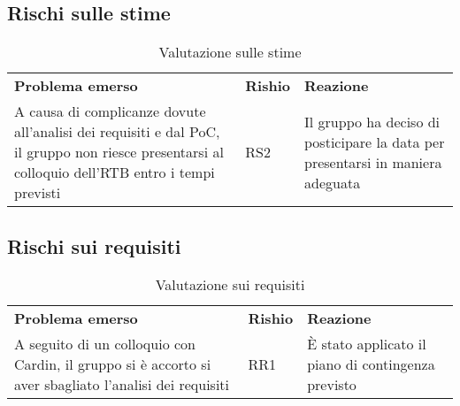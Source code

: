 \clearpage
\subsection{Rischi sulle stime}
    \begin{table}[h]
        \begin{adjustbox}{width=\textwidth}
            \centering
            \renewcommand{\arraystretch}{1.1}
                \begin{tabular}{>{\centering\arraybackslash} m{5cm} >{\centering\arraybackslash} m{1.5cm} >{\centering\arraybackslash} m{4cm}}
                    \rowcolor[HTML]{bfbfbf} 
                    \textbf{Problema emerso} & \textbf{Rishio} & \textbf{Reazione} \\
                    A causa di complicanze dovute all'analisi dei requisiti e dal PoC, il gruppo non riesce presentarsi al colloquio dell'RTB entro i tempi previsti & RS2 & Il gruppo ha deciso di posticipare la data per presentarsi in maniera adeguata\\
                \end{tabular}
            \end{adjustbox}
        \caption{Valutazione sulle stime}
    \end{table}


\subsection{Rischi sui requisiti}
    \begin{table}[h]
        \begin{adjustbox}{width=\textwidth}
            \centering
            \renewcommand{\arraystretch}{1.1}
                \begin{tabular}{>{\centering\arraybackslash} m{5cm} >{\centering\arraybackslash} m{1.5cm} >{\centering\arraybackslash} m{4cm}}
                    \rowcolor[HTML]{bfbfbf} 
                    \textbf{Problema emerso} & \textbf{Rishio} & \textbf{Reazione} \\
                    A seguito di un colloquio con Cardin, il gruppo si è accorto si aver sbagliato l'analisi dei requisiti & RR1 & È stato applicato il piano di contingenza previsto \\
                \end{tabular}
            \end{adjustbox}
        \caption{Valutazione sui requisiti}
    \end{table}